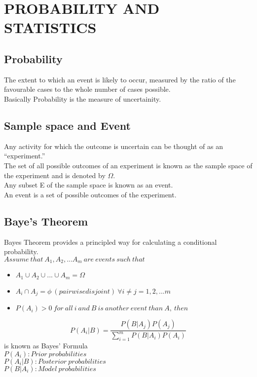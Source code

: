 \section*{PROBABILITY AND STATISTICS}

\subsection*{Probability}
The extent to which an event is likely to occur, measured by the ratio of the favourable cases to the
whole number of cases possible.\\
Basically Probability is the measure of uncertainity.

\subsection*{Sample space and Event}
Any activity for which the outcome is uncertain can be thought of
as an “experiment.”\\
The set of all possible outcomes of an experiment is known as the
sample space of the experiment and is denoted by $\Omega$.\\
Any subset E of the sample space is known as an event.\\
An event is a set of possible outcomes of the experiment.

\subsection*{Baye's Theorem}
Bayes Theorem provides a principled way for calculating a conditional probability.\\
$Assume\ that\ A_1,A_2,...A_m\ are\ events\ such\ that$
\begin{itemize}
    \item $A_1 \cup A_2 \cup ...\cup A_m = \Omega $
    \item $A_i \cap A_j = \phi \ (pairwise disjoint)\ \forall i \neq j = 1,2,...m$
    \item $P(A_i) > 0 \ for \ all \ i \ and \ B \ is \ another \ event \ than \ A, \ then$
\end{itemize}
\[
P(A_i|B) = \frac{P(B|A_j)P(A_j)}{\sum_{i=1}^{m}P(B|A_i)P(A_i)}
\]
is known as Bayes' Formula\\
$P(A_i) : Prior\ probabilities$\\
$P(A_i|B) : Posterior\ probabilities$\\
$P(B|A_i) : Model\ probabilities$

